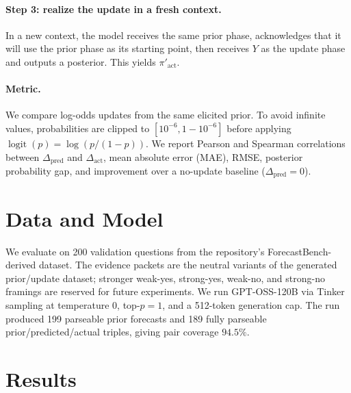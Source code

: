 \documentclass[11pt]{article}
\newcommand{\logit}{\operatorname{logit}}
\newcommand{\pred}{\mathrm{pred}}
\newcommand{\act}{\mathrm{act}}
\begin{document}
\paragraph{Step 3: realize the update in a fresh context.}
In a new context, the model receives the same prior phase, acknowledges that it
will use the prior phase as its starting point, then receives $Y$ as the update
phase and outputs a posterior. This yields $\pi'_{\act}$.

\paragraph{Metric.}
We compare log-odds updates from the same elicited prior. To avoid infinite
values, probabilities are clipped to $[10^{-6},1-10^{-6}]$ before applying
$\logit(p)=\log(p/(1-p))$. We report Pearson and Spearman correlations between
$\Delta_{\pred}$ and $\Delta_{\act}$, mean absolute error (MAE), RMSE, posterior
probability gap, and improvement over a no-update baseline
($\Delta_{\pred}=0$).

\section{Data and Model}

We evaluate on 200 validation questions from the repository's
ForecastBench-derived dataset. The evidence packets are the neutral variants of
the generated prior/update dataset; stronger weak-yes, strong-yes, weak-no, and
strong-no framings are reserved for future experiments. We run GPT-OSS-120B via
Tinker sampling at temperature $0$, top-$p=1$, and a 512-token generation cap.
The run produced 199 parseable prior forecasts and 189 fully parseable
prior/predicted/actual triples, giving pair coverage $94.5\%$.

\section{Results}
\end{document}
